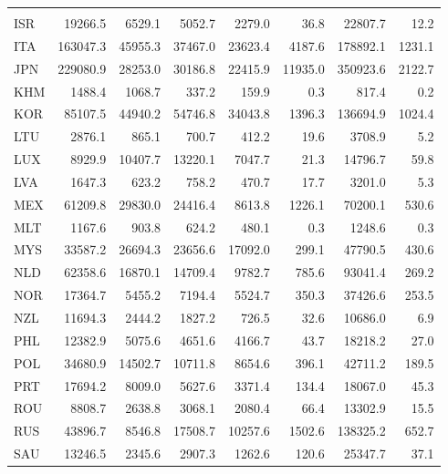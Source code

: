 \documentclass[a4paper,11pt]{article}
\begin{document}
\begin{table}[h]\small
  \centering
    \begin{tabular}{lrrrrrrr}
        \phantom{ISO3} & \phantom{dva\_fin} & \phantom{dva\_int} & \phantom{rdv} & \phantom{ddc} & \phantom{fva\_fin} & \phantom{fva\_int} & \phantom{fdc} \\
     ISR   & 19266.5 & 6529.1 & 5052.7 & 2279.0 & 36.8  & 22807.7 & 12.2 \\
    ITA   & 163047.3 & 45955.3 & 37467.0 & 23623.4 & 4187.6 & 178892.1 & 1231.1 \\
    JPN   & 229080.9 & 28253.0 & 30186.8 & 22415.9 & 11935.0 & 350923.6 & 2122.7 \\
    KHM   & 1488.4 & 1068.7 & 337.2 & 159.9 & 0.3   & 817.4 & 0.2 \\
    KOR   & 85107.5 & 44940.2 & 54746.8 & 34043.8 & 1396.3 & 136694.9 & 1024.4 \\
    LTU   & 2876.1 & 865.1 & 700.7 & 412.2 & 19.6  & 3708.9 & 5.2 \\
    LUX   & 8929.9 & 10407.7 & 13220.1 & 7047.7 & 21.3  & 14796.7 & 59.8 \\
    LVA   & 1647.3 & 623.2 & 758.2 & 470.7 & 17.7  & 3201.0 & 5.3 \\
    MEX   & 61209.8 & 29830.0 & 24416.4 & 8613.8 & 1226.1 & 70200.1 & 530.6 \\
    MLT   & 1167.6 & 903.8 & 624.2 & 480.1 & 0.3   & 1248.6 & 0.3 \\
    MYS   & 33587.2 & 26694.3 & 23656.6 & 17092.0 & 299.1 & 47790.5 & 430.6 \\
    NLD   & 62358.6 & 16870.1 & 14709.4 & 9782.7 & 785.6 & 93041.4 & 269.2 \\
    NOR   & 17364.7 & 5455.2 & 7194.4 & 5524.7 & 350.3 & 37426.6 & 253.5 \\
    NZL   & 11694.3 & 2444.2 & 1827.2 & 726.5 & 32.6  & 10686.0 & 6.9 \\
    PHL   & 12382.9 & 5075.6 & 4651.6 & 4166.7 & 43.7  & 18218.2 & 27.0 \\
    POL   & 34680.9 & 14502.7 & 10711.8 & 8654.6 & 396.1 & 42711.2 & 189.5 \\
    PRT   & 17694.2 & 8009.0 & 5627.6 & 3371.4 & 134.4 & 18067.0 & 45.3 \\
    ROU   & 8808.7 & 2638.8 & 3068.1 & 2080.4 & 66.4  & 13302.9 & 15.5 \\
    RUS   & 43896.7 & 8546.8 & 17508.7 & 10257.6 & 1502.6 & 138325.2 & 652.7 \\
    SAU   & 13246.5 & 2345.6 & 2907.3 & 1262.6 & 120.6 & 25347.7 & 37.1 \\

\end{tabular}
\end{table}
\end{document}
